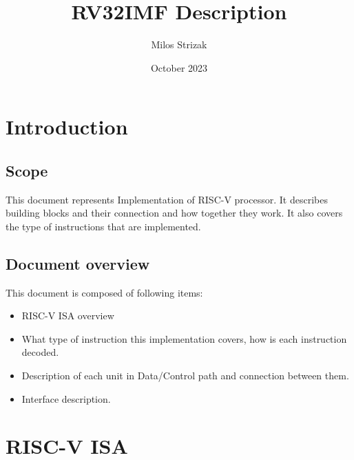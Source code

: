 \documentclass{scrreprt}
\title{RV32IMF Description}
\author{Milos Strizak}
\date{October 2023}
\begin{document}
\maketitle
\thispagestyle{empty}
\tableofcontents
\listoffigures
\listoftables


\newpage

\section*{Introduction}
\subsection*{Scope}
This document represents Implementation of RISC-V processor. It describes building blocks and their 
connection and how together they work. It also covers the type of instructions that are implemented.
\subsection*{Document overview}
This document is composed of following items:
\begin{itemize}
    \item RISC-V ISA overview
    \item What type of instruction this implementation covers, how is each instruction decoded.
    \item Description of each unit in Data/Control path and connection between them.
    \item Interface description. 
\end{itemize}

\newpage
\section*{RISC-V ISA}
\end{document}
